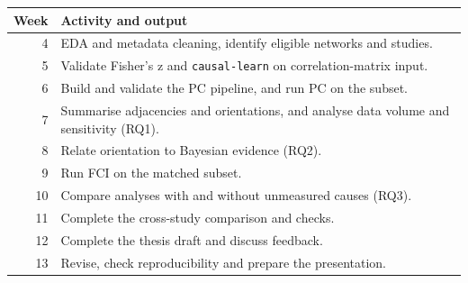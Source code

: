 \documentclass[a4paper]{article}
\begin{document}
\begin{center}
\begin{tabularx}{\textwidth}{@{}r X@{}}
\toprule
\textbf{Week} & \textbf{Activity and output} \\
\midrule
4 & EDA and metadata cleaning, identify eligible networks and studies. \\
5 & Validate Fisher's z and \texttt{causal-learn} on correlation-matrix input. \\
6 & Build and validate the PC pipeline, and run PC on the subset. \\
7 & Summarise adjacencies and orientations, and analyse data volume and sensitivity (RQ1). \\
8 & Relate orientation to Bayesian evidence (RQ2). \\
9 & Run FCI on the matched subset. \\
10 & Compare analyses with and without unmeasured causes (RQ3). \\
11 & Complete the cross-study comparison and checks. \\
12 & Complete the thesis draft and discuss feedback. \\
13 & Revise, check reproducibility and prepare the presentation. \\
\bottomrule
\end{tabularx}
\end{center}



\end{document}
